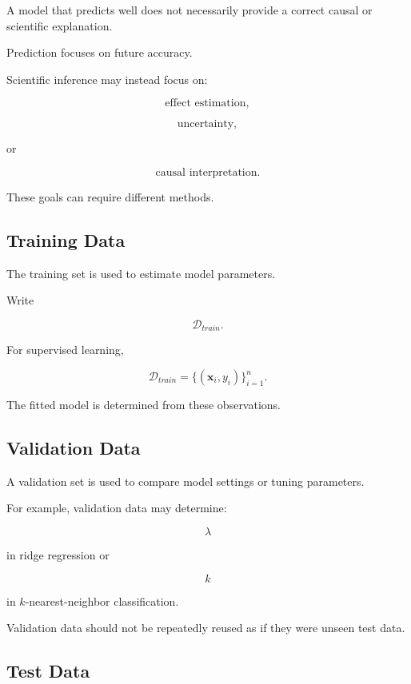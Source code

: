 A model that predicts well does not necessarily provide a correct causal
or scientific explanation.

Prediction focuses on future accuracy.

Scientific inference may instead focus on:

\[
\boxed{
\text{effect estimation},
}
\]

\[
\boxed{
\text{uncertainty},
}
\]

or

\[
\boxed{
\text{causal interpretation}.
}
\]

These goals can require different methods.

\subsection{Training Data}
\label{subsec:training-data}

The training set is used to estimate model parameters.

Write

\[
\boxed{
\mathcal{D}_{train}.
}
\]

For supervised learning,

\[
\mathcal{D}_{train}
=
\{
(\mathbf{x}_i,y_i)
\}_{i=1}^{n}.
\]

The fitted model is determined from these observations.

\subsection{Validation Data}
\label{subsec:validation-data}

A validation set is used to compare model settings or tuning parameters.

For example, validation data may determine:

\[
\boxed{
\lambda
}
\]

in ridge regression or

\[
\boxed{
k
}
\]

in \(k\)-nearest-neighbor classification.

Validation data should not be repeatedly reused as if they were unseen
test data.

\subsection{Test Data}
\label{subsec:test-data}

